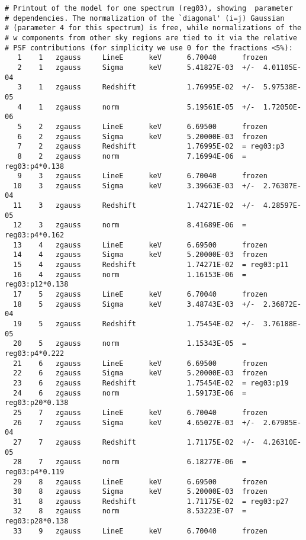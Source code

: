 \begin{lstlisting}[basicstyle=\ttfamily\scriptsize, frame=single]
# Printout of the model for one spectrum (reg03), showing  parameter
# dependencies. The normalization of the `diagonal' (i=j) Gaussian 
# (parameter 4 for this spectrum) is free, while normalizations of the
# w components from other sky regions are tied to it via the relative 
# PSF contributions (for simplicity we use 0 for the fractions <5%):
   1    1   zgauss     LineE      keV      6.70040      frozen
   2    1   zgauss     Sigma      keV      5.41827E-03  +/-  4.01105E-04  
   3    1   zgauss     Redshift            1.76995E-02  +/-  5.97538E-05  
   4    1   zgauss     norm                5.19561E-05  +/-  1.72050E-06  
   5    2   zgauss     LineE      keV      6.69500      frozen
   6    2   zgauss     Sigma      keV      5.20000E-03  frozen
   7    2   zgauss     Redshift            1.76995E-02  = reg03:p3
   8    2   zgauss     norm                7.16994E-06  = reg03:p4*0.138
   9    3   zgauss     LineE      keV      6.70040      frozen
  10    3   zgauss     Sigma      keV      3.39663E-03  +/-  2.76307E-04  
  11    3   zgauss     Redshift            1.74271E-02  +/-  4.28597E-05  
  12    3   zgauss     norm                8.41689E-06  = reg03:p4*0.162
  13    4   zgauss     LineE      keV      6.69500      frozen
  14    4   zgauss     Sigma      keV      5.20000E-03  frozen
  15    4   zgauss     Redshift            1.74271E-02  = reg03:p11
  16    4   zgauss     norm                1.16153E-06  = reg03:p12*0.138
  17    5   zgauss     LineE      keV      6.70040      frozen
  18    5   zgauss     Sigma      keV      3.48743E-03  +/-  2.36872E-04  
  19    5   zgauss     Redshift            1.75454E-02  +/-  3.76188E-05  
  20    5   zgauss     norm                1.15343E-05  = reg03:p4*0.222
  21    6   zgauss     LineE      keV      6.69500      frozen
  22    6   zgauss     Sigma      keV      5.20000E-03  frozen
  23    6   zgauss     Redshift            1.75454E-02  = reg03:p19
  24    6   zgauss     norm                1.59173E-06  = reg03:p20*0.138
  25    7   zgauss     LineE      keV      6.70040      frozen
  26    7   zgauss     Sigma      keV      4.65027E-03  +/-  2.67985E-04  
  27    7   zgauss     Redshift            1.71175E-02  +/-  4.26310E-05  
  28    7   zgauss     norm                6.18277E-06  = reg03:p4*0.119
  29    8   zgauss     LineE      keV      6.69500      frozen
  30    8   zgauss     Sigma      keV      5.20000E-03  frozen
  31    8   zgauss     Redshift            1.71175E-02  = reg03:p27
  32    8   zgauss     norm                8.53223E-07  = reg03:p28*0.138
  33    9   zgauss     LineE      keV      6.70040      frozen

\end{lstlisting}
